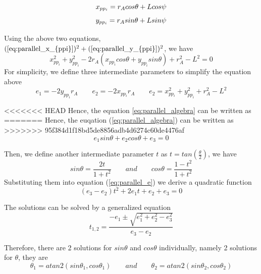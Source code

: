 \documentclass{article}
\begin{document}
\begin{equation}
\label{eq:parallel_x_{ppi}}
x_{pp_i} = r_Acos\theta+Lcos\psi
\end{equation}
\begin{equation}
\label{eq:parallel_y_{ppi}}
y_{pp_i} = r_Asin\theta+Lsin\psi
\end{equation}

Using the above two equations, $(\ref{eq:parallel_x_{ppi}})^2 + (\ref{eq:parallel_y_{ppi}})^2 $, we have
\begin{equation}
\label{eq:parallel_algebra}
x_{pp_i}^2 + y_{pp_i}^2 - 2r_A(x_{pp_i}cos\theta+y_{pp_i}sin\theta)+r_A^2-L^2 = 0
\end{equation}
For simplicity, we define three intermediate parameters to simplify the equation above
\begin{equation}
e_1 = -2y_{pp_i}r_A
\qquad
e_2 = -2x_{pp_i}r_A
\qquad
e_2 =x_{pp_i}^2+y_{pp_i}^2+r_A^2-L^2
\end{equation}

<<<<<<< HEAD
Hence, the equation \ref{eq:parallel_algebra} can be written as
=======
Hence, the euqation (\ref{eq:parallel_algebra}) can be written as
>>>>>>> 95f384d1f18bd5de8856adb4d6274c60de4476af
\begin{equation}
\label{eq:parallel_e}
e_1sin\theta + e_2cos\theta + e_3 = 0
\end{equation}

Then, we define another intermediate parameter $t$ as $t=tan(\frac{\theta}{2})$, we have
\begin{equation}
sin\theta=\frac{2t}{1+t^2}\qquad and \qquad cos\theta=\frac{1-t^2}{1+t^2}
\end{equation}
Substituting them into equation (\ref{eq:parallel_e}) we derive a quadratic function 
\begin{equation}
(e_3-e_2)t^2+2e_1t+e_2+e_3=0
\end{equation}

The solutions can be solved by a generalized equation
\begin{equation}
\label{eq:parallel_t}
t_{1,2}=\frac{-e_1\pm\sqrt{e_1^2+e_2^2-e_3^2}}{e_3-e_2}
\end{equation}

Therefore, there are 2 solutions for $sin\theta$ and $cos\theta$ individually, namely 2 solutions for $\theta$, they are
\begin{equation}
\theta_1 = atan2(sin\theta_1,cos\theta_1)\qquad and \qquad \theta_2 = atan2(sin\theta_2,cos\theta_2)
\end{equation}
\end{document}
